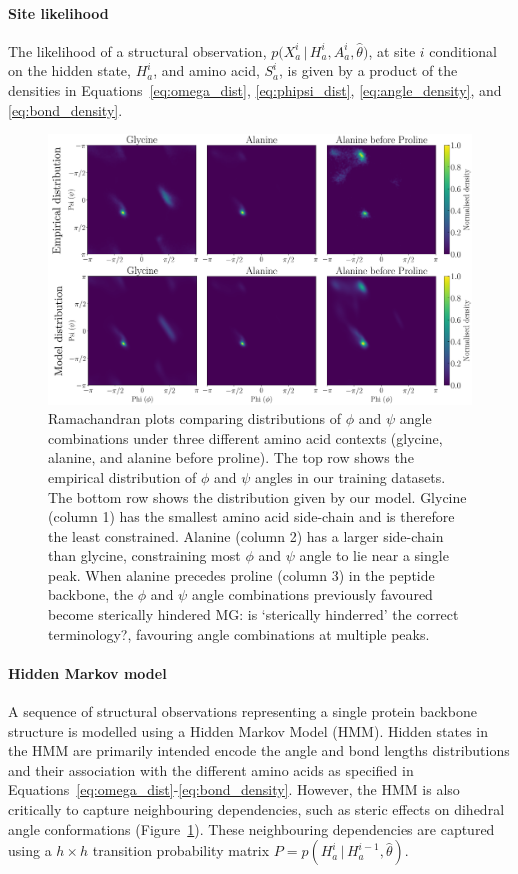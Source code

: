 \documentclass[nogrid]{MBE}%
\newcommand{\revcom}[1]{{\color{orange} #1}}
\begin{document}
\paragraph{Site likelihood}
The likelihood of a structural observation, $p\big(X_{a}^{i}\,|\,H_{a}^{i},A_{a}^{i},\hat{\theta}\big)$, at site $i$ conditional on the hidden state, $H^{i}_a$, and amino acid, $S^{i}_a$, is given by a product of the densities in Equations~\ref{eq:omega_dist}, \ref{eq:phipsi_dist}, \ref{eq:angle_density}, and \ref{eq:bond_density}.

\begin{figure}
	\centering
	\includegraphics[width=2.0\columnwidth]{figures/ramachandran_empirical_and_model.pdf}
	\caption{Ramachandran plots comparing distributions of $\phi$ and $\psi$ angle combinations under three different amino acid contexts  (glycine, alanine, and alanine before proline). The top row shows the empirical distribution of $\phi$ and $\psi$ angles in our training datasets. The bottom row shows the distribution given by our model. Glycine (column 1) has the smallest amino acid side-chain and is therefore the least constrained. Alanine (column 2) has a larger side-chain than glycine, constraining most $\phi$ and $\psi$ angle to lie near a single peak. When alanine precedes proline (column 3) in the peptide backbone, the $\phi$ and $\psi$ angle combinations previously favoured become sterically hindered \revcom{MG: is `sterically hinderred' the correct terminology?}, favouring angle combinations at multiple peaks.}%
	\label{fig:ramachandranempirical}%
\end{figure}

\paragraph{Hidden Markov model}
A sequence of structural observations representing a single protein backbone structure is modelled using a Hidden Markov Model (HMM). Hidden states in the HMM are primarily intended encode the angle and bond lengths distributions and their association with the different amino acids as specified in Equations~\ref{eq:omega_dist}-\ref{eq:bond_density}. However, the HMM is also critically to capture neighbouring dependencies, such as steric effects on dihedral angle conformations (Figure~\ref{fig:ramachandranempirical}). These neighbouring dependencies are captured using a $h\times{h}$ transition probability matrix  $P=p(H_{a}^{i}\,|\,H_{a}^{i-1},\hat{\theta})$.
\end{document}
